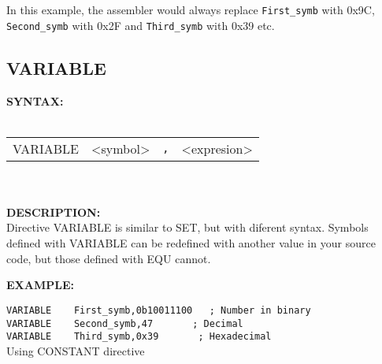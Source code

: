             In this example, the assembler would always replace {\color{highlight_symbol}\verb'First_symb'} with 0x9C,
            {\color{highlight_symbol}\verb'Second_symb'} with 0x2F and {\color{highlight_symbol}\verb'Third_symb'} with 0x39 etc.

            \subsection{VARIABLE}
            \textbf{SYNTAX:}\\
                \\ {
                    \texttt{}
                    \begin{tabular}[h!]{llll}
                            { \color{highlight_directive} VARIABLE } &
                            { \color{highlight_symbol} <symbol> }  &
                            \verb',' &
                            { \color{highlight_constant} <expresion> }\\
                    \end{tabular}
                }\\
                \\
            \textbf{DESCRIPTION:}\\
            Directive VARIABLE is similar to SET, but with diferent syntax. Symbols defined with VARIABLE can be redefined with another value in your source
            code, but those defined with EQU cannot.

            \textbf{EXAMPLE:}\\
                    \begin{code}[h!]
                                    {\color{highlight_directive}\verb'VARIABLE'}\verb'    '{\color{highlight_symbol}\verb'First_symb'}\verb','{\color{highlight_constant}\verb'0b10011100'}\verb'   '{\color{highlight_comment}\verb'; Number in binary'}\\
                                    {\color{highlight_directive}\verb'VARIABLE'}\verb'    '{\color{highlight_symbol}\verb'Second_symb'}\verb','{\color{highlight_constant}\verb'47'}\verb'       '{\color{highlight_comment}\verb'; Decimal'}\\
                                    {\color{highlight_directive}\verb'VARIABLE'}\verb'    '{\color{highlight_symbol}\verb'Third_symb'}\verb','{\color{highlight_constant}\verb'0x39'}\verb'       '{\color{highlight_comment}\verb'; Hexadecimal'}\\
                            \caption{Using CONSTANT directive}
                    \end{code}

